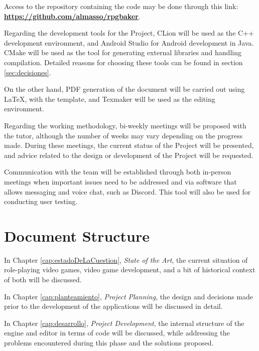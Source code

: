\smallskip

Access to the repository containing the code may be done through this link: \href{https://github.com/almasso/rpgbaker}{\textbf{https://github.com/almasso/rpgbaker}}.

\medskip

Regarding the development tools for the Project, CLion will be used as the C++ development environment, and Android Studio for Android development in Java. CMake will be used as the tool for generating external libraries and handling compilation. Detailed reasons for choosing these tools can be found in section \ref{sec:decisiones}.

\medskip

On the other hand, PDF generation of the document will be carried out using \LaTeX, with the \texis template, and Texmaker will be used as the editing environment.

\bigskip

Regarding the working methodology, bi-weekly meetings will be proposed with the tutor, although the number of weeks may vary depending on the progress made. During these meetings, the current status of the Project will be presented, and advice related to the design or development of the Project will be requested.

\medskip

Communication with the team will be established through both in-person meetings when important issues need to be addressed and via software that allows messaging and voice chat, such as Discord. This tool will also be used for conducting user testing.

\section*{Document Structure} 
In Chapter \ref{cap:estadoDeLaCuestion}, \textit{State of the Art}, the current situation of role-playing video games, video game development, and a bit of historical context of both will be discussed.

\medskip

In Chapter \ref{cap:planteamiento}, \textit{Project Planning}, the design and decisions made prior to the development of the applications will be discussed in detail.

\medskip

In Chapter \ref{cap:desarrollo}, \textit{Project Development}, the internal structure of the engine and editor in terms of code will be discussed, while addressing the problems encountered during this phase and the solutions proposed.

